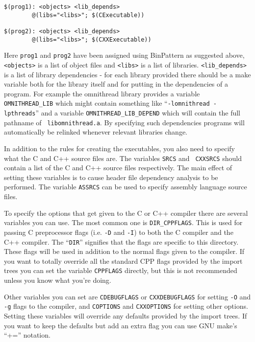 \documentclass[11pt,twoside,onecolumn]{article}
\begin{document}
{\small \begin{verbatim}
$(prog1): <objects> <lib_depends>
        @(libs="<libs>"; $(CExecutable))

$(prog2): <objects> <lib_depends>
        @(libs="<libs>"; $(CXXExecutable))
\end{verbatim}}

Here {\tt prog1} and {\tt prog2} have been assigned using BinPattern as
suggested above, {\tt <objects>} is a list of object files and {\tt <libs>} is
a list of libraries.  \verb|<lib_depends>| is a list of library dependencies -
for each library provided there should be a make variable both for the library
itself and for putting in the dependencies of a program.  For example the
omnithread library provides a variable \verb|OMNITHREAD_LIB| which might
contain something like ``{\tt -lomnithread -lpthreads}'' and a variable
\verb|OMNITHREAD_LIB_DEPEND| which will contain the full pathname of {\tt
libomnithread.a}.  By specifying such dependencies programs will automatically
be relinked whenever relevant libraries change.

In addition to the rules for creating the executables, you also need to specify
what the C and C++ source files are.  The variables {\tt SRCS} and {\tt
CXXSRCS} should contain a list of the C and C++ source files respectively.  The
main effect of setting these variables is to cause header file dependency
analysis to be performed.  The variable {\tt ASSRCS} can be used to specify
assembly language source files.

To specify the options that get given to the C or C++ compiler there are
several variables you can use.  The most common one is \verb|DIR_CPPFLAGS|.
This is used for passing C preprocessor flags (i.e. {\tt -D} and {\tt -I}) to
both the C compiler and the C++ compiler.  The ``{\tt DIR}'' signifies that the
flags are specific to this directory.  These flags will be used in addition to
the normal flags given to the compiler.  If you want to totally override all
the standard CPP flags provided by the import trees you can set the variable
{\tt CPPFLAGS} directly, but this is not recommended unless you know what
you're doing.

Other variables you can set are {\tt CDEBUGFLAGS} or {\tt CXXDEBUGFLAGS} for
setting {\tt -O} and {\tt -g} flags to the compiler, and {\tt COPTIONS} and
{\tt CXXOPTIONS} for setting other options.  Setting these variables will
override any defaults provided by the import trees.  If you want to keep the
defaults but add an extra flag you can use GNU make's ``+='' notation.
\end{document}
